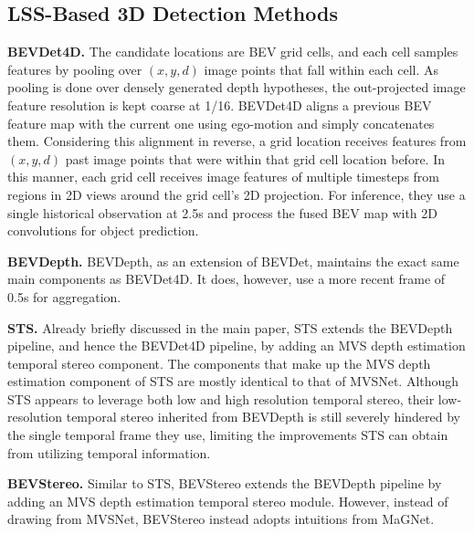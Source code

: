 \documentclass[runningheads, hyperfootnotes=false]{article}
\begin{document}
\subsection{LSS-Based 3D Detection Methods}
\noindent\textbf{BEVDet4D.} The candidate locations are BEV grid cells, and each cell samples features by pooling over $(x, y, d)$ image points that fall within each cell. As pooling is done over densely generated depth hypotheses, the out-projected image feature resolution is kept coarse at 1/16. BEVDet4D aligns a previous BEV feature map with the current one using ego-motion and simply concatenates them. Considering this alignment in reverse, a grid location receives features from $(x, y, d)$ past image points that were within that grid cell location before. In this manner, each grid cell receives image features of multiple timesteps from regions in 2D views around the grid cell's 2D projection. For inference, they use a single historical observation at 2.5s and process the fused BEV map with 2D convolutions for object prediction. 

\noindent\textbf{BEVDepth.} BEVDepth, as an extension of BEVDet, maintains the exact same main components as BEVDet4D. It does, however, use a more recent frame of 0.5s for aggregation.

\noindent\textbf{STS.} Already briefly discussed in the main paper, STS extends the BEVDepth pipeline, and hence the BEVDet4D pipeline, by adding an MVS depth estimation temporal stereo component. The components that make up the MVS depth estimation component of STS are mostly identical to that of MVSNet. Although STS appears to leverage both low and high resolution temporal stereo, their low-resolution temporal stereo inherited from BEVDepth is still severely hindered by the single temporal frame they use, limiting the improvements STS can obtain from utilizing temporal information.

\noindent\textbf{BEVStereo.} Similar to STS, BEVStereo extends the BEVDepth pipeline by adding an MVS depth estimation temporal stereo module. However, instead of drawing from MVSNet, BEVStereo instead adopts intuitions from MaGNet.
\end{document}
